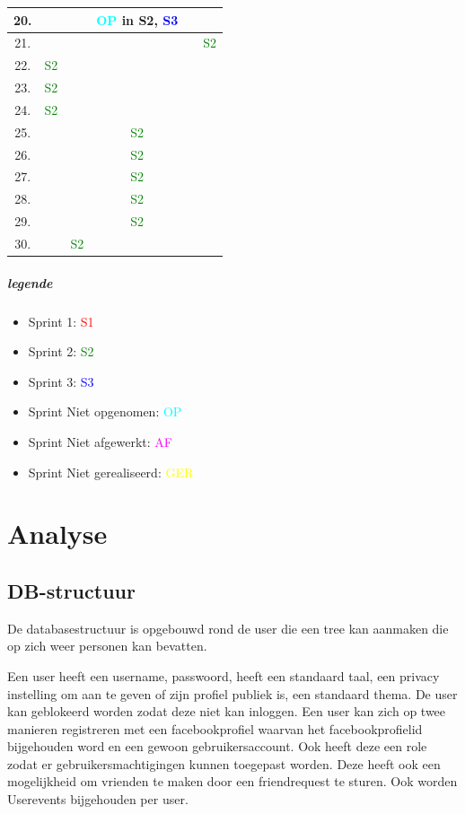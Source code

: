 \documentclass[pdftex,a4paper,12pt,twoside]{report}
\begin{document}
\begin{tabular}{|c|c|c|c|c|c|}
\hline 20.  &  &  & \textcolor{cyan}{OP} in S2, \textcolor{blue}{S3} &  &  \\
\hline 21. &  &  &  &  & \textcolor{green}{S2}   \\ 
\hline 22. & \textcolor{green}{S2}  &  &  &  &  \\
\hline 23.  & \textcolor{green}{S2} &  &  &  &  \\
\hline 24.  & \textcolor{green}{S2} &  &  &  &  \\
\hline 25.  &  &  & \textcolor{green}{S2}  &  &  \\
\hline 26.  &  &  & \textcolor{green}{S2}  &  &  \\
\hline 27.  &  &  & \textcolor{green}{S2}  &  &  \\
\hline 28.  &  &  & \textcolor{green}{S2} &  &  \\
\hline 29.  &  &  & \textcolor{green}{S2} &  &  \\
\hline 30.  &  &\textcolor{green}{S2}  &  &  &  \\
\hline 
\end{tabular} 

\paragraph{legende}
\begin{itemize}
\item Sprint 1: \textcolor{red}{S1}
\item Sprint 2: \textcolor{green}{S2}
\item Sprint 3: \textcolor{blue}{S3}
\item Sprint Niet opgenomen: \textcolor{cyan}{OP}
\item Sprint Niet afgewerkt: \textcolor{magenta}{AF}
\item Sprint Niet gerealiseerd: \textcolor{yellow}{GER}
\end{itemize}

\chapter{Analyse}
\section{DB-structuur}
De databasestructuur is opgebouwd rond de user die een tree kan aanmaken die op zich weer personen kan bevatten. 

Een user heeft een username, passwoord, heeft een standaard taal, een privacy instelling om aan te geven of zijn profiel publiek is, een standaard thema. De user kan geblokeerd worden zodat deze niet kan inloggen.
Een user kan zich op twee manieren registreren met een facebookprofiel waarvan het facebookprofielid bijgehouden word en een gewoon gebruikersaccount. Ook heeft deze een role zodat er gebruikersmachtigingen kunnen toegepast worden.
Deze heeft ook een mogelijkheid om vrienden te maken door een friendrequest te sturen.
Ook worden Userevents bijgehouden per user.
\end{document}
